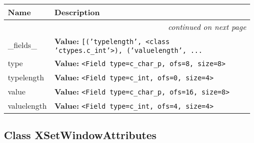     \vspace{-1cm}
\hspace{\varindent}\begin{longtable}{|p{\varnamewidth}|p{\vardescrwidth}|l}
\cline{1-2}
\cline{1-2} \centering \textbf{Name} & \centering \textbf{Description}& \\
\cline{1-2}
\endhead\cline{1-2}\multicolumn{3}{r}{\small\textit{continued on next page}}\\\endfoot\cline{1-2}
\endlastfoot\raggedright \_\-f\-i\-e\-l\-d\-s\-\_\- & \raggedright \textbf{Value:} 
{\tt \texttt{[}\texttt{(}\texttt{'}\texttt{typelength}\texttt{'}\texttt{, }{\textless}class 'ctypes.c\_int'{\textgreater}\texttt{)}\texttt{, }\texttt{(}\texttt{'}\texttt{valuelength}\texttt{'}\texttt{, }\texttt{...}}&\\
\cline{1-2}
\raggedright t\-y\-p\-e\- & \raggedright \textbf{Value:} 
{\tt {\textless}Field type=c\_char\_p, ofs=8, size=8{\textgreater}}&\\
\cline{1-2}
\raggedright t\-y\-p\-e\-l\-e\-n\-g\-t\-h\- & \raggedright \textbf{Value:} 
{\tt {\textless}Field type=c\_int, ofs=0, size=4{\textgreater}}&\\
\cline{1-2}
\raggedright v\-a\-l\-u\-e\- & \raggedright \textbf{Value:} 
{\tt {\textless}Field type=c\_char\_p, ofs=16, size=8{\textgreater}}&\\
\cline{1-2}
\raggedright v\-a\-l\-u\-e\-l\-e\-n\-g\-t\-h\- & \raggedright \textbf{Value:} 
{\tt {\textless}Field type=c\_int, ofs=4, size=4{\textgreater}}&\\
\cline{1-2}
\end{longtable}



\subsection{Class XSetWindowAttributes}


